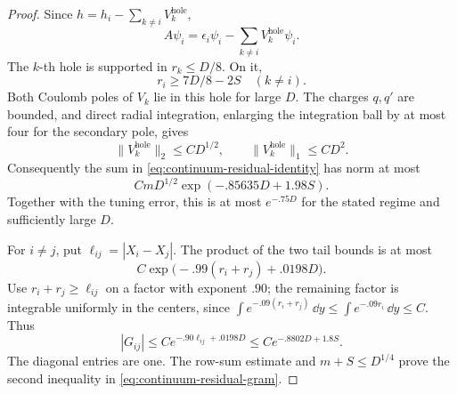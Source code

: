 \begin{proof}
Since \(h=h_i-\sum_{k\ne i}V_k^{\mathrm{hole}}\),
\begin{equation}
 A\psi_i=\epsilon_i\psi_i-
       \sum_{k\ne i}V_k^{\mathrm{hole}}\psi_i.
 \label{eq:continuum-residual-identity}
\end{equation}
The \(k\)-th hole is supported in \(r_k\le D/8\).  On it,
\[
 r_i\ge 7D/8-2S\quad(k\ne i).
\]
Both Coulomb poles of \(V_k\) lie in this hole for large \(D\).
The charges \(q,q'\) are bounded, and direct radial integration,
enlarging the integration ball by at most four for the secondary
pole, gives
\begin{equation}
 \|V_k^{\mathrm{hole}}\|_2\le C D^{1/2},
 \qquad
 \|V_k^{\mathrm{hole}}\|_1\le C D^2.
 \label{eq:continuum-hole-norms}
\end{equation}
Consequently the sum in \eqref{eq:continuum-residual-identity}
has norm at most
\[
 CmD^{1/2}\exp(-.85635D+1.98S).
\]
Together with the tuning error, this is at most \(e^{-.75D}\)
for the stated regime and sufficiently large \(D\).

For \(i\ne j\), put \(\ell_{ij}=|X_i-X_j|\).
The product of the two tail bounds is at most
\[
 C\exp\bigl(-.99(r_i+r_j)+.0198D\bigr).
 \]
Use \(r_i+r_j\ge \ell_{ij}\) on a factor with exponent \(.90\);
the remaining factor is integrable uniformly in the centers,
since
\(\int e^{-.09(r_i+r_j)}\,\dd y\le
\int e^{-.09r_i}\,\dd y\le C\).
Thus
\[
 |G_{ij}|\le C e^{-.90\ell_{ij}+.0198D}
 \le C e^{-.8802D+1.8S}.
\]
The diagonal entries are one.  The row-sum estimate and
\(m+S\le D^{1/4}\) prove the second inequality in
\eqref{eq:continuum-residual-gram}.


\end{proof}
